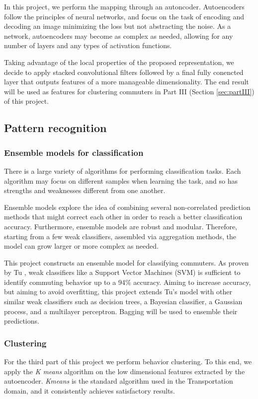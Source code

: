 \documentclass{article}
\begin{document}
In this project, we perform the mapping through an autoncoder. Autoencoders follow the principles of neural networks, and focus on the task of encoding and decoding an image minimizing the loss but not abstracting the noise. As a network, autoencoders may become as complex as needed, allowing for any number of layers and any types of activation functions. 

Taking advantage of the local properties of the proposed representation, we decide to apply stacked convolutional filters followed by a final fully conencted layer that outputs features of a more manageable dimensionality. The end result will be used as features for clustering commuters in Part III (Section \ref{sec:partIII}) of this project. 


\subsection{Pattern recognition}

\subsubsection{Ensemble models for classification}
There is a large variety of algorithms for performing classification tasks. Each algorithm may focus on different samples when learning the task, and so has strengths and weaknesses different from one another. 

Ensemble models explore the idea of combining several non-correlated prediction methods that might correct each other in order to reach a better classification accuracy. Furthermore, ensemble models are robust and modular. Therefore, starting from a few weak classifiers, assembled via aggregation methods, the model can grow larger or more complex as needed.

This project constructs an ensemble model for classifying commuters. As proven by Tu \cite{tu2016impact}, weak classifiers like a Support Vector Machines (SVM) is sufficient to identify commuting behavior up to a 94\% accuracy. Aiming to increase accuracy, but aiming to avoid overfitting, this project extends Tu's model with other similar weak classifiers such as decision trees, a Bayesian classifier, a Gaussian process, and a multilayer perceptron. Bagging will be used to ensemble their predictions. %

\subsubsection{Clustering} 
For the third part of this project we perform behavior clustering. To this end, we apply the \textit{K means} algorithm on the low dimensional features extracted by the autoencoder. \textit{Kmeans} is the standard algorithm used in the Transportation domain, and it consistently achieves satisfactory results. 
\end{document}
